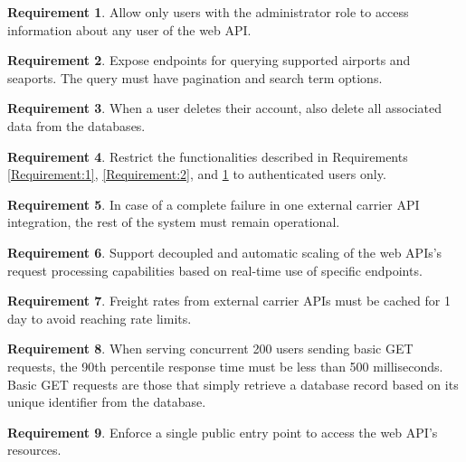 \documentclass[12pt, reqno]{amsbook}
\theoremstyle{definition}
\theoremstyle{definition}
\newtheorem{requirement}{Requirement}
\numberwithin{section}{chapter}
\numberwithin{table}{chapter}
\numberwithin{figure}{chapter}
\begin{document}
\begin{requirement}
  \label{Requirement:3}
  Allow only users with the administrator role to access information about any user of the web \ac{API}.
\end{requirement}

\begin{requirement}
  \label{Requirement:4}
  Expose endpoints for querying supported airports and seaports. The query must have pagination and search term options.
\end{requirement}

\begin{requirement}
  \label{Requirement:5}
  When a user deletes their account, also delete all associated data from the databases.
\end{requirement}

\begin{requirement}
  \label{Requirement:6}
  Restrict the functionalities described in Requirements \ref{Requirement:1}, \ref{Requirement:2}, and \ref{Requirement:3} to authenticated users only.
\end{requirement}

\begin{requirement}
  \label{Requirement:7}
  In case of a complete failure in one external carrier \ac{API} integration, the rest of the system must remain operational.
\end{requirement}

\begin{requirement}
  \label{Requirement:8}
  Support decoupled and automatic scaling of the web \acp{API}'s request processing capabilities based on real-time use of specific endpoints.
\end{requirement}

\begin{requirement}
  \label{Requirement:9}
  Freight rates from external carrier \acp{API} must be cached for 1 day to avoid reaching rate limits.
\end{requirement}

\begin{requirement}
  \label{Requirement:10}
  When serving concurrent 200 users sending basic GET requests, the 90th percentile response time must be less than 500 milliseconds. Basic GET requests are those that simply retrieve a database record based on its unique identifier from the database.
\end{requirement}

\begin{requirement}
  \label{Requirement:11}
  Enforce a single public entry point to access the web \ac{API}'s resources.
\end{requirement}
\end{document}
